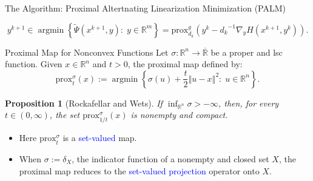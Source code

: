 \documentclass[9pt,handout]{beamer} %
\newtheorem{proposition}{Proposition}
\newcommand{\s}{\sigma}
\newcommand{\prox}{\mathrm{prox}} %
\newcommand{\rr}{\mathbb{R}} %
\newcommand{\R}{\mathbb{R}} %
\newcommand{\norm}[1]{\left\Vert {#1} \right\Vert} %
\newcommand{\argmin}{\operatorname{argmin}}
\begin{document}
\begin{frame}{The Algorithm: Proximal Altertnating Linearization Minimization (PALM)}
\begin{center}
{{\begin{enumerate}
\begin{enumerate}
\begin{equation*}
                           		y^{k + 1} \in \argmin \left\{ \widetilde{\Psi}(x^{k+1},y) : \; y \in \R^m \right\} = \prox_{d_{k}}^{g}\left(y^{k} - {d_{k}}^{-1}\nabla_{y} H\left(x^{k + 1}, y^{k}\right)\right).
    	                   \end{equation*}
                \end{enumerate}
            \end{enumerate}}}
       	\end{center}
        \pause
        \begin{center}
        \end{center}

    \end{frame}

    \begin{frame}{Proximal Map for Nonconvex Functions}
        Let $\sigma : \rr^{n} \rightarrow \overline{\rr}$ be a proper and lsc function. Given 
        $x \in \rr^{n}$ and $t > 0$, the proximal map defined by:
        \begin{equation*}
            \prox_{t}^{\sigma}\left(x\right) := \argmin \left\{ \sigma\left(u\right) + 
            \frac{t}{2}\norm{u - x}^{2} : \; u \in \rr^{n} \right\}.
        \end{equation*}
        \pause
        \begin{proposition}[Rockafellar and Wets] \label{P:WellProximal}
            If $\inf_{\rr^{n}} \sigma > -\infty$, then, for every $t \in \left(0 , 
            \infty\right)$, the set $\prox_{1/t}^{\sigma}\left(x\right)$ is nonempty and 
            compact.
        \end{proposition}
        \pause
        \begin{itemize}[<+->]
            \item Here $\prox_{t}^{\sigma}$ is a \textcolor{blue}{set-valued} map. \medskip
            \item When $\sigma := \delta_{X}$, the indicator function of a nonempty and 
            	closed set $X$, the proximal map reduces to the \textcolor{blue}{set-valued 
            	projection} operator onto $X$.
        \end{itemize}
    \end{frame}
\end{document}
